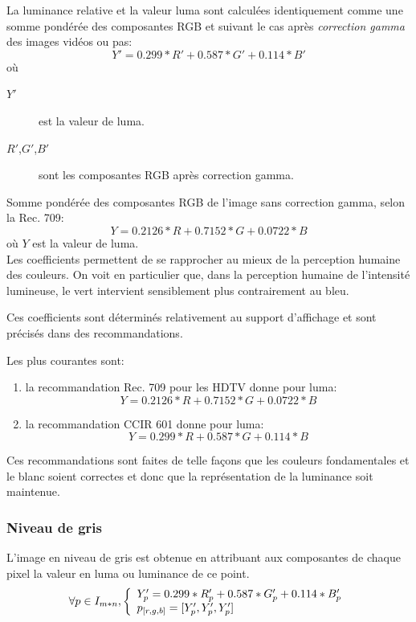 \documentclass[a4paper,12pt]{report}
\begin{document}
La luminance relative et la valeur luma sont calculées identiquement comme une somme pondérée des composantes RGB et suivant le cas après \textit{correction gamma} des images vidéos ou pas:
$$ Y' = 0.299*R' + 0.587*G' + 0.114*B' $$
où
\begin{description}
\item[$Y'$] est la valeur de luma.
\item[$R'$,$G'$,$B'$] sont les composantes RGB après correction gamma.\\
\end{description}

Somme pondérée des composantes RGB de l'image sans correction gamma, selon la Rec. 709:
$$Y = 0.2126*R + 0.7152*G + 0.0722*B$$ 
où $Y$ est la valeur de luma.\\

Les coefficients permettent de se rapprocher au mieux de la perception humaine des couleurs. On voit en particulier que, dans la perception humaine de l'intensité lumineuse, le vert intervient sensiblement plus contrairement au bleu.


Ces coefficients sont déterminés relativement au support d'affichage et sont précisés dans des recommandations. 

Les plus courantes sont:
\begin{enumerate}
\item la recommandation Rec. 709 pour les HDTV donne pour luma: 
$$Y =  0.2126*R+0.7152*G+0.0722*B $$ 
\item la recommandation CCIR 601 donne pour luma: 
$$Y =  0.299*R+0.587*G+0.114*B $$
\end{enumerate}
Ces recommandations sont faites de telle façons que les couleurs fondamentales et le blanc soient correctes et donc que la représentation de la luminance soit maintenue.\\


\subsubsection*{Niveau de gris}

L'image en niveau de gris est obtenue en attribuant aux composantes de chaque pixel la valeur en luma ou luminance de ce point.
$$
	\forall p \in I_{m*n}, \left\{
	\begin{array}{l l}
	Y'_p = 0.299*R'_p + 0.587*G_p' + 0.114*B'_p \\ 
	p_{[r,g,b]} = [Y'_p,Y'_p,Y'_p] 
	\end{array} \right.
$$
\end{document}
